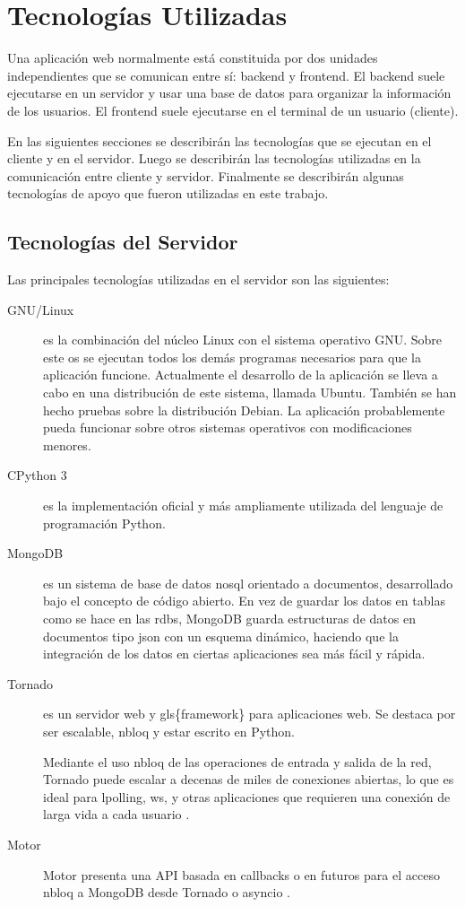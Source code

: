 \chapter{Tecnologías Utilizadas}\label{tecnologuxedas-utilizadas}

Una aplicación \gls{web} normalmente está constituida por dos unidades
independientes que se comunican entre sí: \gls{backend} y
\gls{frontend}. El \gls{backend} suele ejecutarse en un \gls{servidor} y
usar una base de datos para organizar la información de los usuarios. El
\gls{frontend} suele ejecutarse en el terminal de un usuario
(\gls{cliente}).

En las siguientes secciones se describirán las tecnologías que se
ejecutan en el \gls{cliente} y en el \gls{servidor}. Luego se
describirán las tecnologías utilizadas en la comunicación entre
\gls{cliente} y \gls{servidor}. Finalmente se describirán algunas
tecnologías de apoyo que fueron utilizadas en este trabajo.

\section{Tecnologías del Servidor}\label{tecnologuxedas-del-servidor}

Las principales tecnologías utilizadas en el \gls{servidor} son las
siguientes:

\begin{description}
\item[GNU/Linux]
es la combinación del núcleo Linux con el sistema operativo GNU. Sobre
este \gls{os} se ejecutan todos los demás programas necesarios para que
la aplicación funcione. Actualmente el desarrollo de la aplicación se
lleva a cabo en una distribución de este sistema, llamada Ubuntu.
También se han hecho pruebas sobre la distribución Debian. La aplicación
probablemente pueda funcionar sobre otros sistemas operativos con
modificaciones menores.
\item[CPython 3]
es la implementación oficial y más ampliamente utilizada del lenguaje de
programación Python.
\item[MongoDB]
es un sistema de base de datos \gls{nosql} orientado a documentos,
desarrollado bajo el concepto de código abierto. En vez de guardar los
datos en tablas como se hace en las \glspl{rdb}, MongoDB guarda
estructuras de datos en documentos tipo \gls{json} con un esquema
dinámico, haciendo que la integración de los datos en ciertas
aplicaciones sea más fácil y rápida.
\item[Tornado]
es un \gls{servidor} \gls{web} y gls\{framework\} para aplicaciones
\gls{web}. Se destaca por ser escalable, \gls{nbloq} y estar escrito en
Python.

Mediante el uso \gls{nbloq} de las operaciones de entrada y salida de la
red, Tornado puede escalar a decenas de miles de conexiones abiertas, lo
que es ideal para \gls{lpolling}, \gls{ws}, y otras aplicaciones que
requieren una conexión de larga vida a cada usuario \cite{tornado}.
\item[Motor]
Motor presenta una API basada en \glspl{callback} o en \glspl{futuro}
para el acceso \gls{nbloq} a MongoDB desde Tornado o \gls{asyncio}
\cite{motor}.
\end{description}

